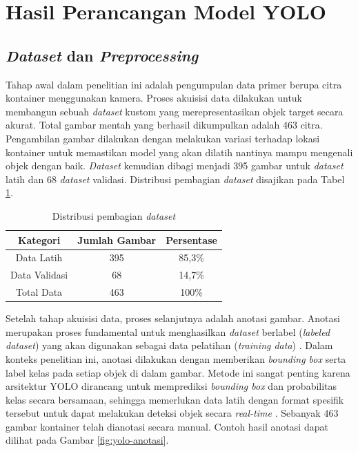 \section{Hasil Perancangan Model YOLO}
\subsection{\textit{Dataset} dan \textit{Preprocessing}}
Tahap awal dalam penelitian ini adalah pengumpulan data primer berupa
citra kontainer menggunakan kamera. Proses akuisisi data dilakukan
untuk membangun sebuah \textit{dataset} kustom yang merepresentasikan objek
target secara akurat. Total gambar mentah yang berhasil dikumpulkan
adalah 463 citra. Pengambilan gambar dilakukan dengan melakukan
variasi terhadap lokasi kontainer untuk memastikan model yang akan
dilatih nantinya mampu mengenali objek dengan baik. \textit{Dataset} kemudian
dibagi menjadi 395 gambar untuk \textit{dataset} latih dan 68 \textit{dataset}
validasi. Distribusi pembagian \textit{dataset} disajikan pada Tabel
\ref{tab:pembagian-dataset}.

\begin{table}[H]
  \caption{Distribusi pembagian \textit{dataset}}
  \label{tab:pembagian-dataset}
  \vspace{-1em}
  \centering
  \begin{tabular}{ccc}
    \toprule
    \textbf{Kategori} & \textbf{Jumlah Gambar} & \textbf{Persentase} \\
    \midrule
    Data Latih & 395 & 85,3\% \\
    Data Validasi & 68 & 14,7\% \\
    Total Data & 463 & 100\% \\
    \bottomrule
  \end{tabular}
\end{table}

Setelah tahap akuisisi data, proses selanjutnya adalah anotasi
gambar. Anotasi merupakan proses fundamental untuk menghasilkan
\textit{dataset} berlabel (\textit{labeled \textit{dataset}}) yang
akan digunakan
sebagai data pelatihan (\textit{training data}) \citep{19}. Dalam
konteks penelitian
ini, anotasi dilakukan dengan memberikan \textit{bounding box} serta label
kelas pada setiap objek di dalam gambar. Metode ini sangat penting
karena arsitektur YOLO dirancang untuk memprediksi \textit{bounding box} dan
probabilitas kelas secara bersamaan, sehingga memerlukan data latih
dengan format spesifik tersebut untuk dapat melakukan deteksi objek
secara \textit{real-time} \citep{20}. Sebanyak 463 gambar kontainer
telah dianotasi
secara manual. Contoh hasil anotasi dapat dilihat pada Gambar
\ref{fig:yolo-anotasi}.

